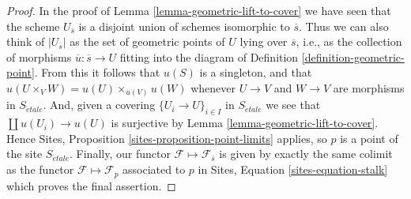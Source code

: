 \documentclass[10pt,a4paper]{amsart}
\theoremstyle{plain}
\theoremstyle{definition}
\theoremstyle{remark}
\numberwithin{equation}{subsection}
\def\etale{{\acute{e}tale}}
\begin{document}
\begin{proof}
In the proof of
Lemma \ref{lemma-geometric-lift-to-cover}
we have seen that the scheme $U_{\overline{s}}$ is a disjoint union of
schemes isomorphic to $\overline{s}$. Thus we can also think of
$|U_{\overline{s}}|$ as the set of geometric points of $U$ lying over
$\overline{s}$, i.e., as the collection of morphisms
$\overline{u} : \overline{s} \to U$ fitting into the diagram of
Definition \ref{definition-geometric-point}.
From this it follows that $u(S)$ is a singleton, and that
$u(U \times_V W) = u(U) \times_{u(V)} u(W)$
whenever $U \to V$ and $W \to V$ are morphisms in $S_\etale$.
And, given a covering $\{U_i \to U\}_{i \in I}$ in $S_\etale$
we see that $\coprod u(U_i) \to u(U)$ is surjective by
Lemma \ref{lemma-geometric-lift-to-cover}.
Hence
Sites, Proposition \ref{sites-proposition-point-limits}
applies, so $p$ is a point of the site $S_\etale$.
Finally, our functor $\mathcal{F} \mapsto \mathcal{F}_{\overline{s}}$
is given by exactly the same colimit as the functor
$\mathcal{F} \mapsto \mathcal{F}_p$ associated to $p$ in
Sites, Equation \ref{sites-equation-stalk}
which proves the final assertion.
\end{proof}
\end{document}
